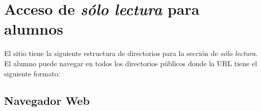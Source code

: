 \newpage

    \section {Acceso de \textsl{s\'{o}lo lectura} para alumnos}
    \label{sec:man-ro}

El sitio tiene la siguiente estructura de directorios para la secci\'{o}n de \textit{s\'{o}lo lectura}. El alumno puede navegar en todos los directorios p\'{u}blicos donde la \textsc{URL} tiene el siguiente formato:

{
 \linespread{1}
 \begin{table}[H]
 \caption{Formato de la \textsc{URL} de la secci\'{o}n de \textit{s\'{o}lo lectura}}{}
 \label{tab:csv-format}
 \noindent{} %
 \end{table}
}

      \subsection {Navegador Web}
      \label{subsec:man-ro-browser}

